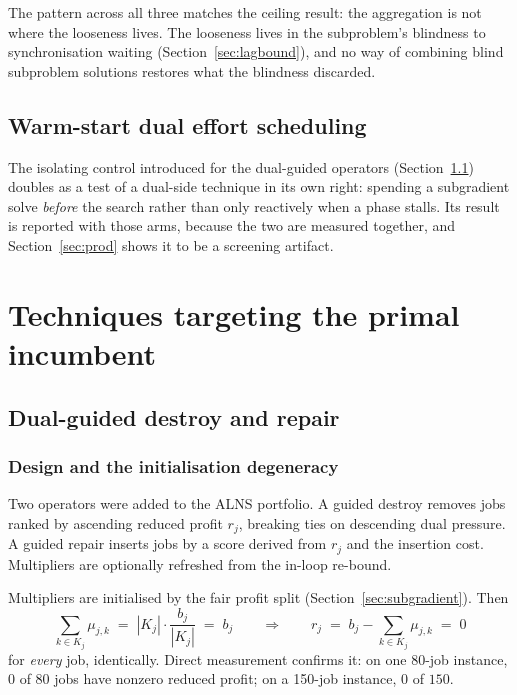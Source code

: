 \documentclass[11pt,a4paper]{article}
\newcommand{\Kj}{\ensuremath{K_j}}
\begin{document}
The pattern across all three matches the ceiling result: the aggregation is not
where the looseness lives. The looseness lives in the subproblem's blindness to
synchronisation waiting (Section~\ref{sec:lagbound}), and no way of combining
blind subproblem solutions restores what the blindness discarded.

\subsection{Warm-start dual effort scheduling}\label{sec:warm}

The isolating control introduced for the dual-guided operators
(Section~\ref{sec:guided}) doubles as a test of a dual-side technique in its own
right: spending a subgradient solve \emph{before} the search rather than only
reactively when a phase stalls. Its result is reported with those arms, because
the two are measured together, and Section~\ref{sec:prod} shows it to be a
screening artifact.

\section{Techniques targeting the primal incumbent}\label{sec:primal}

\subsection{Dual-guided destroy and repair}\label{sec:guided}

\subsubsection{Design and the initialisation degeneracy}\label{sec:degeneracy}

Two operators were added to the ALNS portfolio. A guided destroy removes jobs
ranked by ascending reduced profit $r_j$, breaking ties on descending dual
pressure. A guided repair inserts jobs by a score derived from $r_j$ and the
insertion cost. Multipliers are optionally refreshed from the in-loop re-bound.

Multipliers are initialised by the fair profit split
(Section~\ref{sec:subgradient}). Then
\[
\sum_{k\in \Kj}\mu_{j,k}\;=\;|\Kj|\cdot\frac{b_j}{|\Kj|}\;=\;b_j
\qquad\Longrightarrow\qquad
r_j \;=\; b_j-\sum_{k\in \Kj}\mu_{j,k} \;=\; 0
\]
for \emph{every} job, identically. Direct measurement confirms it: on one 80-job
instance, $0$ of $80$ jobs have nonzero reduced profit; on a 150-job instance, $0$
of $150$.
\end{document}
